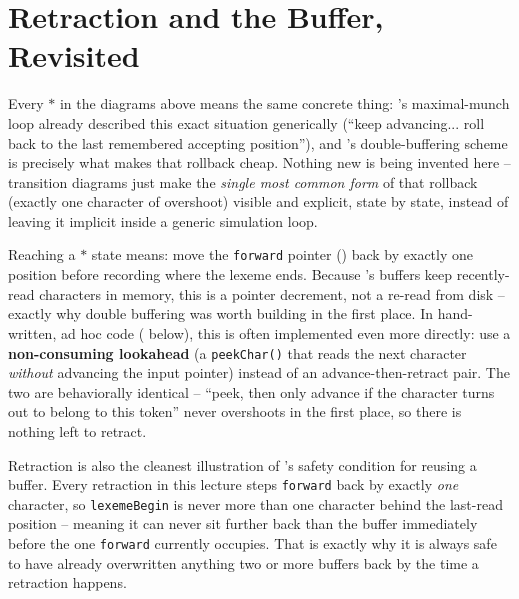 \documentclass[full-course-notes.tex]{subfiles}
\begin{document}
\section{Retraction and the Buffer, Revisited}
\label{sec:l7-retraction}

\dbtag Every $*$ in the diagrams above means the same concrete thing:
's maximal-munch loop already described this exact situation
generically (``keep advancing... roll back to the last remembered accepting position''), and
's double-buffering scheme is precisely what makes that rollback
cheap. Nothing new is being invented here -- transition diagrams just make the \emph{single
most common form} of that rollback (exactly one character of overshoot) visible and explicit,
state by state, instead of leaving it implicit inside a generic simulation loop.

\begin{coreidea}
Reaching a $*$ state means: move the \texttt{forward} pointer ()
back by exactly one position before recording where the lexeme ends. Because
's buffers keep recently-read characters in memory, this is a
pointer decrement, not a re-read from disk -- exactly why double buffering was worth building
in the first place. In hand-written, ad hoc code ( below), this is often
implemented even more directly: use a \textbf{non-consuming lookahead} (a \texttt{peekChar()}
that reads the next character \emph{without} advancing the input pointer) instead of an
advance-then-retract pair. The two are behaviorally identical -- ``peek, then only advance if
the character turns out to belong to this token'' never overshoots in the first place, so
there is nothing left to retract.
\end{coreidea}

\begin{examfocus}
Retraction is also the cleanest illustration of 's safety
condition for reusing a buffer. Every retraction in this lecture steps \texttt{forward} back by
exactly \emph{one} character, so \texttt{lexemeBegin} is never more than one character behind
the last-read position -- meaning it can never sit further back than the buffer immediately
before the one \texttt{forward} currently occupies. That is exactly why it is always safe to
have already overwritten anything two or more buffers back by the time a retraction happens.
\end{examfocus}
\end{document}
